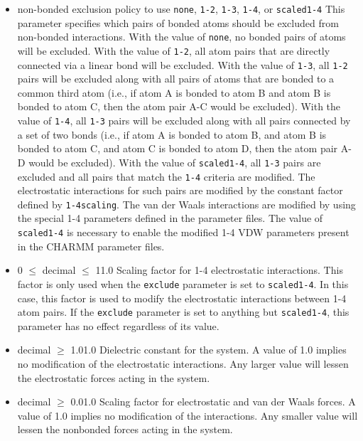 \begin{itemize}
\item
{}
{non-bonded exclusion policy to use}
{{\tt none}, {\tt 1-2}, {\tt 1-3}, {\tt 1-4}, or {\tt scaled1-4}}
{\label{param:exclude}
This parameter specifies which pairs of bonded atoms should
be excluded from non-bonded
interactions.  With the value of {\tt none}, no bonded pairs of atoms 
will be excluded.  With the value of {\tt 1-2}, all atom pairs that
are directly connected via a linear bond will be excluded.  With the
value of {\tt 1-3}, all {\tt 1-2} pairs will be excluded along with
all pairs of atoms that are bonded to a common
third atom (i.e., if atom A is bonded to atom B and atom B is bonded
to atom C, then the atom pair A-C would be excluded).
With the value of {\tt 1-4}, all {\tt 1-3} pairs will be excluded along
with all pairs connected by a set of two bonds (i.e., if atom A is bonded
to atom B, and atom B is bonded to atom C, and atom C is bonded to
atom D, then the atom pair A-D would be excluded).  With the value
of {\tt scaled1-4}, all {\tt 1-3} pairs are excluded and all pairs
that match the {\tt 1-4} criteria are modified.  The electrostatic
interactions for such pairs are modified by the constant factor
defined by {\tt 1-4scaling}.  
The van der Waals interactions are modified
by using the special 1-4 parameters defined in the parameter files.
The value of {\tt scaled1-4} is necessary to enable the modified
1-4 VDW parameters present in the CHARMM parameter files.
}

\item
{}
{0 $\leq$ decimal $\leq$ 1}{1.0}
{Scaling factor for 1-4 electrostatic interactions.
This factor is only used when the
{\tt exclude} parameter is set to {\tt scaled1-4}.  In this case, this
factor is used to modify the electrostatic interactions between 1-4 atom
pairs.  If the {\tt exclude} parameter is set to anything but 
{\tt scaled1-4}, this parameter has no effect regardless of its value.}

\item
{}
{decimal $\geq$ 1.0}{1.0}
{Dielectric constant for the system.  A value of 1.0 implies no modification
of the electrostatic interactions.  Any larger value will lessen the
electrostatic forces acting in the system.}

\item
{}
{decimal $\geq$ 0.0}{1.0}
{Scaling factor for electrostatic and van der Waals forces.
A value of 1.0 implies no modification of the interactions.
Any smaller value will lessen the
nonbonded forces acting in the system.}


\end{itemize}
